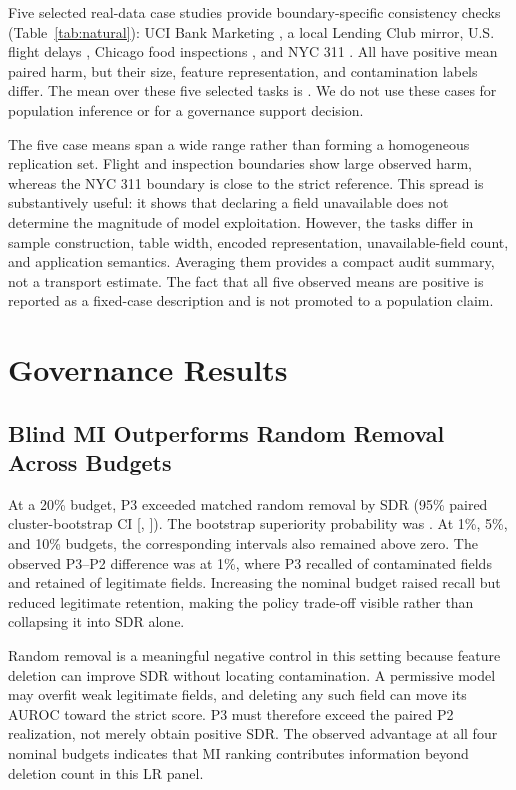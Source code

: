 \documentclass[sigconf,review]{acmart}
\begin{document}
Five selected real-data case studies provide boundary-specific consistency
checks (Table~\ref{tab:natural}): UCI Bank Marketing \cite{uciBankMarketing},
a local Lending Club mirror, U.S. flight delays \cite{btsOnTime}, Chicago food
inspections \cite{chicagoFoodInspections}, and NYC 311 \cite{nyc311}. All have
positive mean paired harm, but their size, feature representation, and
contamination labels differ. The mean over these five selected tasks is
\NaturalMeanHarm{}. We do not use these cases for population inference or for
a governance support decision.

The five case means span a wide range rather than forming a homogeneous
replication set. Flight and inspection boundaries show large observed harm,
whereas the NYC 311 boundary is close to the strict reference. This spread is
substantively useful: it shows that declaring a field unavailable does not
determine the magnitude of model exploitation. However, the tasks differ in
sample construction, table width, encoded representation, unavailable-field
count, and application semantics. Averaging them provides a compact audit
summary, not a transport estimate. The fact that all five observed means are
positive is reported as a fixed-case description and is not promoted to a
population claim.



\section{Governance Results}

\subsection{Blind MI Outperforms Random Removal Across Budgets}

At a 20\% budget, P3 exceeded matched random removal by \GovTwentyDiff{} SDR
(95\% paired cluster-bootstrap CI [\GovTwentyLow{}, \GovTwentyHigh{}]). The
bootstrap superiority probability was \GovTwentyProb{}. At 1\%, 5\%, and 10\%
budgets, the corresponding intervals also remained above zero. The observed
P3--P2 difference was \GovOneDiff{} at 1\%, where P3 recalled \GovOneRecall{}
of contaminated fields and retained \GovOneRetention{} of legitimate fields.
Increasing the nominal budget raised recall but reduced legitimate retention,
making the policy trade-off visible rather than collapsing it into SDR alone.

Random removal is a meaningful negative control in this setting because feature
deletion can improve SDR without locating contamination. A permissive model may
overfit weak legitimate fields, and deleting any such field can move its AUROC
toward the strict score. P3 must therefore exceed the paired P2 realization,
not merely obtain positive SDR. The observed advantage at all four nominal
budgets indicates that MI ranking contributes information beyond deletion
count in this LR panel.
\end{document}

